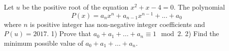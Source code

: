 Let $u$ be the positive root of the equation $x^2+x-4=0$. The polynomial
$$P(x)=a_nx^n+a_{n-1}x^{n-1}+...+a_0$$where $n$ is positive integer has non-negative integer coefficients and $P(u)=2017$.
1) Prove that $a_0+a_1+...+a_n\equiv 1\mod 2$.
2) Find the minimum possible value of $a_0+a_1+...+a_n$.